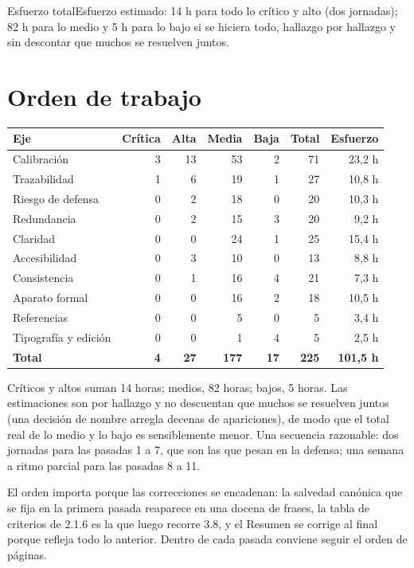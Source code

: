 \begin{recuadro}{Esfuerzo total}Esfuerzo estimado: 14 h para todo lo crítico y alto (dos jornadas); 82 h para lo medio y 5 h para lo bajo si se hiciera todo, hallazgo por hallazgo y sin descontar que muchos se resuelven juntos.\end{recuadro}
\clearpage
\section{Orden de trabajo}
\begin{center}\small\begin{tabular}{@{}lrrrrrr@{}}\toprule
\sffamily\bfseries Eje & \sffamily\bfseries Crítica & \sffamily\bfseries Alta & \sffamily\bfseries Media & \sffamily\bfseries Baja & \sffamily\bfseries Total & \sffamily\bfseries Esfuerzo\\\midrule
Calibración & 3 & 13 & 53 & 2 & 71 & 23,2 h\\
Trazabilidad & 1 & 6 & 19 & 1 & 27 & 10,8 h\\
Riesgo de defensa & 0 & 2 & 18 & 0 & 20 & 10,3 h\\
Redundancia & 0 & 2 & 15 & 3 & 20 & 9,2 h\\
Claridad & 0 & 0 & 24 & 1 & 25 & 15,4 h\\
Accesibilidad & 0 & 3 & 10 & 0 & 13 & 8,8 h\\
Consistencia & 0 & 1 & 16 & 4 & 21 & 7,3 h\\
Aparato formal & 0 & 0 & 16 & 2 & 18 & 10,5 h\\
Referencias & 0 & 0 & 5 & 0 & 5 & 3,4 h\\
Tipografía y edición & 0 & 0 & 1 & 4 & 5 & 2,5 h\\
\midrule\textbf{Total} & \textbf{4} & \textbf{27} & \textbf{177} & \textbf{17} & \textbf{225} & \textbf{101,5 h}\\\bottomrule\end{tabular}\end{center}
Críticos y altos suman 14 horas; medios, 82 horas; bajos, 5 horas. Las estimaciones son por hallazgo y no descuentan que muchos se resuelven juntos (una decisión de nombre arregla decenas de apariciones), de modo que el total real de lo medio y lo bajo es sensiblemente menor. Una secuencia razonable: dos jornadas para las pasadas 1 a 7, que son las que pesan en la defensa; una semana a ritmo parcial para las pasadas 8 a 11.\par\medskip
El orden importa porque las correcciones se encadenan: la salvedad canónica que se fija en la primera pasada reaparece en una docena de frases, la tabla de criterios de 2.1.6 es la que luego recorre 3.8, y el Resumen se corrige al final porque refleja todo lo anterior. Dentro de cada pasada conviene seguir el orden de páginas.
